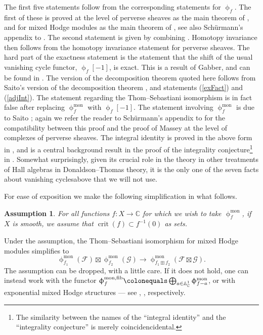 \documentclass[a4paper,10pt]{amsart}
\renewcommand{\phi}{\upphi}
\newtheorem{assumption}[theorem]{Assumption}
\newcommand{\phim}[1]{\phi^{\mon}_{#1}}
\DeclareMathOperator{\crit}{crit}
\DeclareMathOperator{\mon}{mon}
\begin{document}
The first five statements follow from the corresponding statements for $\phi_f$.  The first of these is proved at the level of perverse sheaves as the main theorem of \cite{Ma09}, and for mixed Hodge modules as the main theorem of \cite{Sai89duality}, see also Sch\"urmann's appendix to \cite{Br12}.  The second statement is given by combining \cite[Thm.2.14, Thm.4.3]{Saito90}.  Homotopy invariance then follows from the homotopy invariance statement for perverse sheaves.  The hard part of the exactness statement is the statement that the shift of the usual vanishing cycle functor, $\phi_f[-1]$, is exact.  This is a result of Gabber, and can be found in \cite{BBD}.  The version of the decomposition theorem quoted here follows from Saito's version of the decomposition theorem \cite{Saito90}, and statements (\ref{exFact}) and (\ref{adjInt}).  The statement regarding the Thom--Sebastiani isomorphism is in fact false after replacing $\phim{f}$ with $\phi_f[-1]$.  The statement involving $\phim{f}$ is due to Saito \cite{Saito10}; again we refer the reader to Sch\"urmann's appendix to \cite{Br12} for the compatibility between this proof and the proof of Massey \cite{Ma01} at the level of complexes of perverse sheaves.  The integral identity is proved in the above form in \cite{KS2}, and is a central background result in the proof of the integrality conjecture\footnote{The similarity between the names of the ``integral identity'' and the ``integrality conjecture'' is merely coincidencidental.} in \cite{KS2}.  Somewhat surprisingly, given its crucial role in the theory in other treatments of Hall algebras in Donaldson--Thomas theory, it is the only one of the seven facts about vanishing cyclesabove  that we will not use.

For ease of exposition we make the following simplification in what follows.
\begin{assumption}
\label{phicheat}
For all functions $f\colon X\rightarrow \mathbb{C}$ for which we wish to take $\phim{f}$, if $X$ is smooth, we assume that $\crit(f)\subset f^{-1}(0)$ as sets.
\end{assumption}
Under the assumption, the Thom--Sebastiani isomorphism for mixed Hodge modules simplifies to
\[
\phim{f_1}(\mathcal{F})\boxtimes\phim{f_2}(\mathcal{G})\rightarrow\phim{f_1\boxplus f_2}(\mathcal{F}\boxtimes\mathcal{G}).
\]
The assumption can be dropped, with a little care.  If it does not hold, one can instead work with the functor $\phi^{\mon,\textrm{fib}}_f\colonequals \bigoplus_{a\in\mathbb{A}_{\mathbb{C}}^1}\phim{f-a}$, or with exponential mixed Hodge structures --- see \cite{DaMe4}, \cite{KS2}, respectively.
\end{document}
